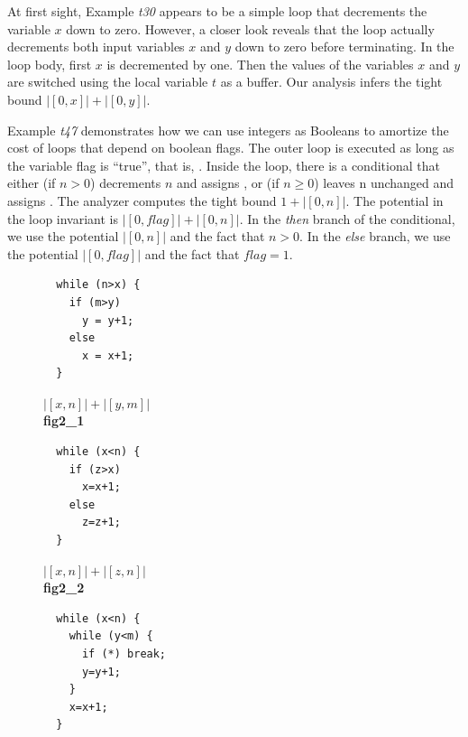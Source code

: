 \documentclass{sigplanconf}
\begin{document}
{At first sight, Example \emph{t30} appears to be a simple loop that
decrements the variable $x$ down to zero.  However, a closer look
reveals that the loop actually decrements both input variables $x$ and
$y$ down to zero before terminating.  In the loop body, first $x$ is
decremented by one.  Then the values of the variables $x$ and $y$ are
switched using the local variable $t$ as a buffer.  Our analysis
infers the tight bound $|[0,x]|+|[0,y]|$.

Example \emph{t47} demonstrates how we can use integers as Booleans to
amortize the cost of loops that depend on boolean flags.  The outer
loop is executed as long as the variable flag is ``true'', that is,
.  Inside the loop, there is a conditional that either
(if $n>0$) decrements $n$ and assigns , or (if $n\geq0$)
leaves n unchanged and assigns .  The analyzer computes
the tight bound $1 + |[0, n]|$.  The potential in the loop invariant
is $|[0,\mathit{flag}]| + |[0, n]|$.  In the \emph{then} branch of
the conditional, we use the potential $|[0, n]|$ and the fact that
$n>0$.  In the \emph{else} branch, we use the potential
$|[0,\mathit{flag}]|$ and the fact that $\mathit{flag}=1$.




\begin{figure}
 \setlength{\progwidth}{.24\linewidth}
  \centering
  \begin{minipage}[b]{\progwidth}
    \begin{center}
   \begin{lstlisting}
  while (n>x) {
    if (m>y)
      y = y+1;
    else
      x = x+1;
  }
   \end{lstlisting}

$|[x, n]| + |[y, m]|$
\\[.7\baselineskip]
      {\bf fig2\_1}
    \end{center}
  \end{minipage}
%
%
  \begin{minipage}[b]{\progwidth}
    \begin{center}
   \begin{lstlisting}
  while (x<n) {
    if (z>x)
      x=x+1;
    else
      z=z+1;
  }
   \end{lstlisting}

$|[x, n]| + |[z, n]|$
\\[.7\baselineskip]
      {\bf fig2\_2}
    \end{center}
  \end{minipage}
%
%
  \begin{minipage}[b]{\progwidth}
    \begin{center}
   \begin{lstlisting}
  while (x<n) {
    while (y<m) {
      if (*) break;
      y=y+1;
    }
    x=x+1;
  }
   \end{lstlisting}


\end{center}
\end{minipage}
\end{figure}}
\end{document}
